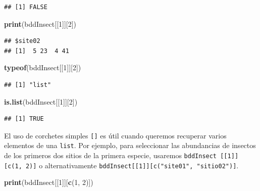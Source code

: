 \documentclass[
]{book}
\newenvironment{Shaded}{\begin{snugshade}}{\end{snugshade}}
\newcommand{\DecValTok}[1]{\textcolor[rgb]{0.00,0.00,0.81}{#1}}
\newcommand{\KeywordTok}[1]{\textcolor[rgb]{0.13,0.29,0.53}{\textbf{#1}}}
\newcommand{\NormalTok}[1]{#1}
\begin{document}
\begin{verbatim}
## [1] FALSE
\end{verbatim}

\begin{Shaded}
\begin{Highlighting}[]
\KeywordTok{print}\NormalTok{(bddInsect[[}\DecValTok{1}\NormalTok{]][}\DecValTok{2}\NormalTok{])}
\end{Highlighting}
\end{Shaded}

\begin{verbatim}
## $site02
## [1]  5 23  4 41
\end{verbatim}

\begin{Shaded}
\begin{Highlighting}[]
\KeywordTok{typeof}\NormalTok{(bddInsect[[}\DecValTok{1}\NormalTok{]][}\DecValTok{2}\NormalTok{])}
\end{Highlighting}
\end{Shaded}

\begin{verbatim}
## [1] "list"
\end{verbatim}

\begin{Shaded}
\begin{Highlighting}[]
\KeywordTok{is.list}\NormalTok{(bddInsect[[}\DecValTok{1}\NormalTok{]][}\DecValTok{2}\NormalTok{])}
\end{Highlighting}
\end{Shaded}

\begin{verbatim}
## [1] TRUE
\end{verbatim}

El uso de corchetes simples \texttt{{[}{]}} es útil cuando queremos recuperar varios elementos de una \texttt{list}. Por ejemplo, para seleccionar las abundancias de insectos de los primeros dos sitios de la primera especie, usaremos \texttt{bddInsect\ {[}{[}1{]}{]}{[}c(1,\ 2){]}} o alternativamente \texttt{bddInsect{[}{[}1{]}{]}{[}c("site01",\ "sitio02"){]}}.

\begin{Shaded}
\begin{Highlighting}[]
\KeywordTok{print}\NormalTok{(bddInsect[[}\DecValTok{1}\NormalTok{]][}\KeywordTok{c}\NormalTok{(}\DecValTok{1}\NormalTok{, }\DecValTok{2}\NormalTok{)])}
\end{Highlighting}
\end{Shaded}
\end{document}
